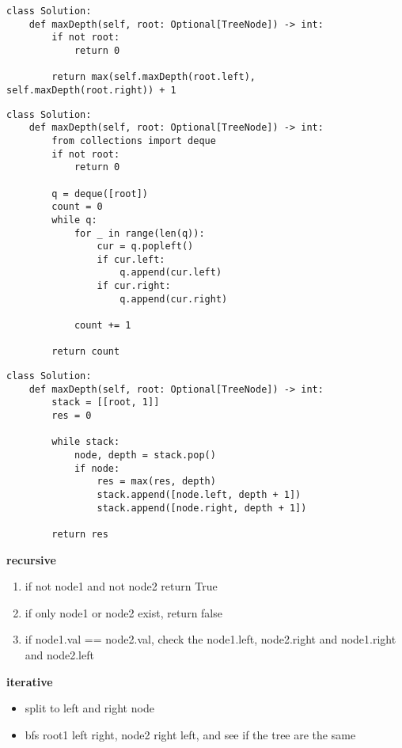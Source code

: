 \documentclass{assignmeownt}
\begin{document}
\begin{lstlisting}[caption = dfs recursive]
    class Solution:
    def maxDepth(self, root: Optional[TreeNode]) -> int:
        if not root:
            return 0
            
        return max(self.maxDepth(root.left), self.maxDepth(root.right)) + 1
\end{lstlisting}

\begin{lstlisting}[caption = bfs]
    class Solution:
    def maxDepth(self, root: Optional[TreeNode]) -> int:
        from collections import deque
        if not root:
            return 0
        
        q = deque([root])
        count = 0
        while q:
            for _ in range(len(q)):
                cur = q.popleft()
                if cur.left:
                    q.append(cur.left)
                if cur.right:
                    q.append(cur.right)
            
            count += 1

        return count

\end{lstlisting}

\begin{lstlisting}[caption = dfs iterative]
    class Solution:
    def maxDepth(self, root: Optional[TreeNode]) -> int:
        stack = [[root, 1]]
        res = 0

        while stack:
            node, depth = stack.pop()
            if node:
                res = max(res, depth)
                stack.append([node.left, depth + 1])
                stack.append([node.right, depth + 1])

        return res
\end{lstlisting}



\textbf{recursive}
\begin{enumerate}
    \item if not node1 and not node2 return True
    \item if only node1 or node2 exist, return false
    \item if node1.val == node2.val, check the node1.left, node2.right and node1.right and node2.left
\end{enumerate}

\textbf{iterative}
\begin{itemize}
    \item split to left and right node
    \item bfs root1 left right, node2 right left, and see if the tree are the same
\end{itemize}
\end{document}
